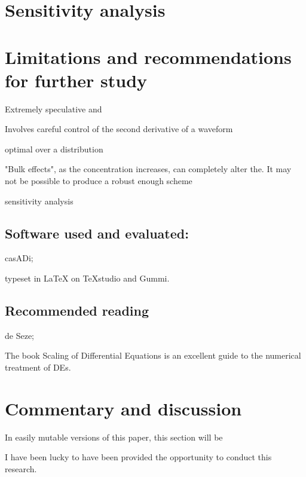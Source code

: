 \documentclass[fleqn,10pt]{paper}
\begin{document}
\section*{Sensitivity analysis}

\section*{Limitations and recommendations for further study}

Extremely speculative and 

Involves careful control of the second derivative of a waveform 

optimal over a distribution 

"Bulk effects", as the concentration increases, can completely alter the. It may not be possible to produce a robust enough scheme 


sensitivity analysis

\subsection*{Software used and evaluated:}

casADi;

typeset in LaTeX on TeXstudio and Gummi.





\subsection*{Recommended reading}

de Seze; 

The book Scaling of Differential Equations is an excellent guide to the numerical treatment of DEs.

\section*{Commentary and discussion}

In easily mutable versions of this paper, this section will be 



I have been lucky to have been provided the opportunity to conduct this research. 
\end{document}

